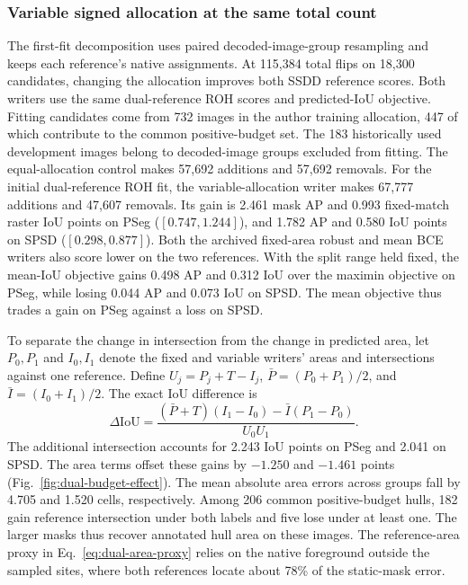 \documentclass[journal]{IEEEtran}
\begin{document}
\subsubsection{Variable signed allocation at the same total count}
\label{sec:variable-sign-results}
The first-fit decomposition uses paired decoded-image-group resampling and keeps each reference's native assignments.
At 115,384 total flips on 18,300 candidates, changing the allocation improves both SSDD reference scores. Both writers use the same dual-reference ROH scores and predicted-IoU objective. Fitting candidates come from 732 images in the author training allocation, 447 of which contribute to the common positive-budget set. The 183 historically used development images belong to decoded-image groups excluded from fitting. The equal-allocation control makes 57,692 additions and 57,692 removals. For the initial dual-reference ROH fit, the variable-allocation writer makes 67,777 additions and 47,607 removals. Its gain is 2.461 mask AP and 0.993 fixed-match raster IoU points on PSeg (\([0.747,1.244]\)), and 1.782 AP and 0.580 IoU points on SPSD (\([0.298,0.877]\)). Both the archived fixed-area robust and mean BCE writers also score lower on the two references. With the split range held fixed, the mean-IoU objective gains 0.498 AP and 0.312 IoU over the maximin objective on PSeg, while losing 0.044 AP and 0.073 IoU on SPSD. The mean objective thus trades a gain on PSeg against a loss on SPSD.

To separate the change in intersection from the change in predicted area, let \(P_0,P_1\) and \(I_0,I_1\) denote the fixed and variable writers' areas and intersections against one reference. Define \(U_j=P_j+T-I_j\), \(\bar P=(P_0+P_1)/2\), and \(\bar I=(I_0+I_1)/2\). The exact IoU difference is
\begin{equation}
 \Delta\mathrm{IoU} =
 \frac{(\bar P+T)(I_1-I_0)-\bar I(P_1-P_0)}{U_0 U_1}.
 \label{eq:area-overlap-parts}
\end{equation}
The additional intersection accounts for 2.243 IoU points on PSeg and 2.041 on SPSD. The area terms offset these gains by \(-1.250\) and \(-1.461\) points (Fig.~\ref{fig:dual-budget-effect}). The mean absolute area errors across groups fall by 4.705 and 1.520 cells, respectively. Among 206 common positive-budget hulls, 182 gain reference intersection under both labels and five lose under at least one. The larger masks thus recover annotated hull area on these images. The reference-area proxy in Eq.~\eqref{eq:dual-area-proxy} relies on the native foreground outside the sampled sites, where both references locate about 78\% of the static-mask error.
\end{document}
